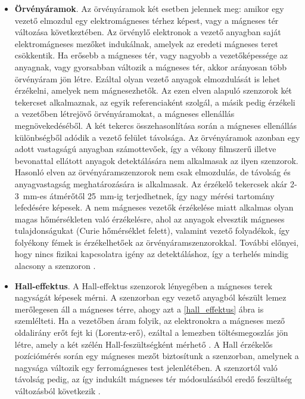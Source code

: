 \begin{itemize}
	\item \textbf{Örvényáramok}. Az örvényáramok két esetben jelennek meg: amikor egy vezető elmozdul egy elektromágneses térhez képest, vagy a mágneses tér változása következtében. Az örvénylő elektronok a vezető anyagban saját elektromágneses mezőket indukálnak, amelyek az eredeti mágneses teret csökkentik. Ha erősebb a mágneses tér, vagy nagyobb a vezetőképessége az anyagnak, vagy gyorsabban változik a mágneses tér, akkor arányosan több örvényáram jön létre. Ezáltal olyan vezető anyagok elmozdulását is lehet érzékelni, amelyek nem mágnesezhetők. Az ezen elven alapuló szenzorok két tekercset alkalmaznak, az egyik referenciaként szolgál, a másik pedig érzékeli a vezetőben létrejövő örvényáramokat, a mágneses ellenállás megnövekedéséből. A két tekercs összehasonlítása során a mágneses ellenállás különbségből adódik a vezető felület távolsága. Az örvényáramok azonban egy adott vastagságú anyagban számottevőek, így a vékony filmszerű illetve bevonattal ellátott anyagok detektálására nem alkalmasak az ilyen szenzorok. Hasonló elven az örvényáramszenzorok nem csak elmozdulás, de távolság és anyagvastagság meghatározására is alkalmasak. Az érzékelő tekercsek akár 2-3~mm-es átmérőtől 25~mm-ig terjedhetnek, így nagy mérési tartomány lefedésére képesek. A nem mágneses vezetők érzékelése miatt alkalmas olyan magas hőmérsékleten való érzékelésre, ahol az anyagok elvesztik mágneses tulajdonságukat (Curie hőmérséklet felett), valamint vezető folyadékok, így folyékony fémek is érzékelhetőek az örvényáramszenzorokkal. További előnyei, hogy nincs fizikai kapcsolatra igény az detektáláshoz, így a terhelés mindig alacsony a szenzoron \cite{Fraden2016a}.
	\item \textbf{Hall-effektus}. A Hall-effektus szenzorok lényegében a mágneses terek nagyságát képesek mérni. A szenzorban egy vezető anyagból készült lemez merőlegesen áll a mágneses térre, ahogy azt a \ref{hall_effektus} ábra is szemlélteti. Ha a vezetőben áram folyik, az elektronokra a mágneses mező oldalirány erőt fejt ki (Lorentz-erő), ezáltal a lemezben töltésmegoszlás jön létre, amely a két szélén Hall-feszültségként mérhető \cite{Fraden2016}. A Hall érzékelős pozíciómérés során egy mágneses mezőt biztosítunk a szenzorban, amelynek a nagysága változik egy ferromágneses test jelenlétében. A szenzortól való távolság pedig, az így indukált mágneses tér módosulásából eredő feszültség változásból következik \cite{Morris2016}. 
	\begin{figure}
		\centering

\end{figure}
\end{itemize}
